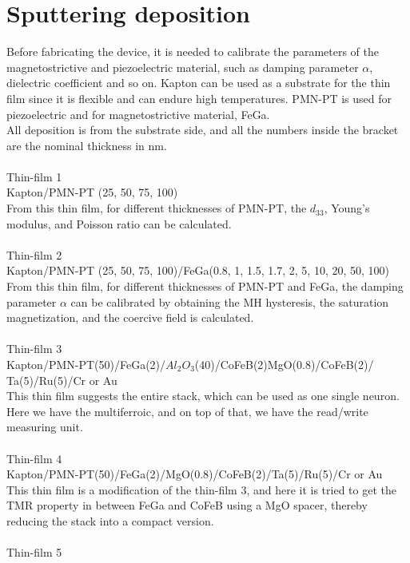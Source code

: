 \documentclass[12pt,a4paper,bold]{thesis}
\theoremstyle{thm}
\theoremstyle{definition}
\begin{document}
\section{Sputtering deposition}
\indent\indent\indent Before fabricating the device, it is needed to calibrate the parameters of the magnetostrictive and piezoelectric material, such as damping parameter $\alpha$, dielectric coefficient and so on.
Kapton can be used as a substrate for the thin film since it is flexible and can endure high temperatures. PMN-PT is used for piezoelectric and for magnetostrictive material, FeGa.\\
All deposition is from the substrate side, and all the numbers inside the bracket are the nominal thickness in nm.\\\\
Thin-film 1\\
Kapton/PMN-PT (25, 50, 75, 100)\\
From this thin film, for different thicknesses of PMN-PT, the $d_{33}$, Young's modulus, and Poisson ratio can be calculated.\\\\
Thin-film 2\\
Kapton/PMN-PT (25, 50, 75, 100)/FeGa(0.8, 1, 1.5, 1.7, 2, 5, 10, 20, 50, 100)\\
From this thin film, for different thicknesses of PMN-PT and FeGa, the damping parameter $\alpha$ can be calibrated by obtaining the MH hysteresis, the saturation magnetization, and the coercive field is calculated.\\\\
Thin-film 3\\
Kapton/PMN-PT(50)/FeGa(2)/$Al_2O_3$(40)/CoFeB(2)MgO(0.8)/CoFeB(2)/\\Ta(5)/Ru(5)/Cr or Au\\
This thin film suggests the entire stack, which can be used as one single neuron. Here we have the multiferroic, and on top of that, we have the read/write measuring unit.\\\\
Thin-film 4\\
Kapton/PMN-PT(50)/FeGa(2)/MgO(0.8)/CoFeB(2)/Ta(5)/Ru(5)/Cr or Au\\
This thin film is a modification of the thin-film 3, and here it is tried to get the TMR property in between FeGa and CoFeB using a MgO spacer, thereby reducing the stack into a compact version.\\\\
Thin-film 5\\
\end{document}
